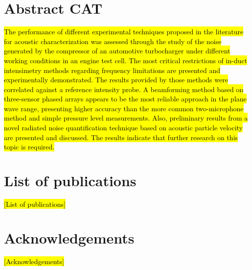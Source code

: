 \documentclass[final,twoside,11pt]{book}
\makeatletter
\numberwithin{equation}{section}
\numberwithin{figure}{chapter}
\numberwithin{table}{chapter}
\def\cleardoublepage{\clearpage\if@twoside \ifodd\c@page\else
  \hbox{}
  \thispagestyle{empty}
  \newpage
  \if@twocolumn\hbox{}\newpage\fi\fi\fi}
\makeatother
\begin{document}
\chapter*{Abstract CAT}
\hl{The performance of different experimental techniques proposed in the literature for acoustic characterization was assessed through the study of the noise generated by the compressor of an automotive turbocharger under different working conditions in an engine test cell. The most critical restrictions of in-duct intensimetry methods regarding frequency limitations are presented and experimentally demonstrated. The results provided by those methods were correlated against a reference intensity probe. A beamforming method based on three-sensor phased arrays appears to be the most reliable approach in the plane wave range, presenting higher accuracy than the more common two-microphone method and simple pressure level measurements. Also, preliminary results from a novel radiated noise quantification technique based on acoustic particle velocity are presented and discussed. The results indicate that further research on this topic is required.}
\cleardoublepage

\chapter*{List of publications}
\hl{[List of publications]}
\cleardoublepage

\chapter*{Acknowledgements}
\hl{[Acknowledgements]}
\cleardoublepage

\null\vspace{2cm}
\end{document}
